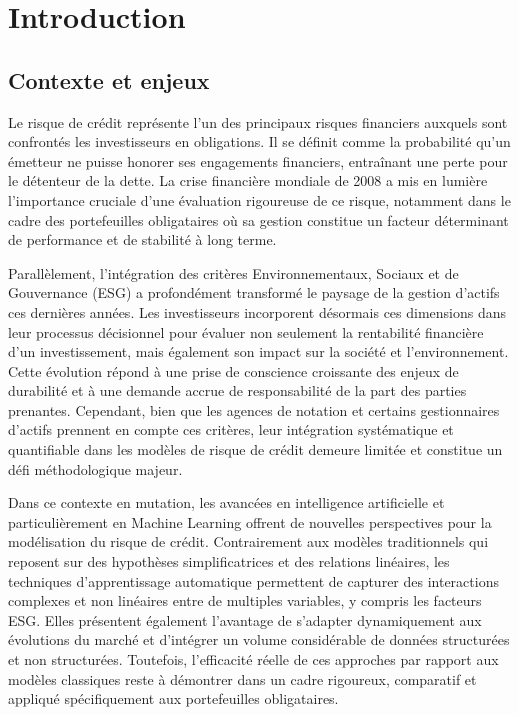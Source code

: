 \chapter{Introduction}

\section{Contexte et enjeux}

Le risque de crédit représente l'un des principaux risques financiers auxquels sont confrontés les investisseurs en obligations. Il se définit comme la probabilité qu'un émetteur ne puisse honorer ses engagements financiers, entraînant une perte pour le détenteur de la dette. La crise financière mondiale de 2008 a mis en lumière l'importance cruciale d'une évaluation rigoureuse de ce risque, notamment dans le cadre des portefeuilles obligataires où sa gestion constitue un facteur déterminant de performance et de stabilité à long terme.

Parallèlement, l'intégration des critères Environnementaux, Sociaux et de Gouvernance (ESG) a profondément transformé le paysage de la gestion d'actifs ces dernières années. Les investisseurs incorporent désormais ces dimensions dans leur processus décisionnel pour évaluer non seulement la rentabilité financière d'un investissement, mais également son impact sur la société et l'environnement. Cette évolution répond à une prise de conscience croissante des enjeux de durabilité et à une demande accrue de responsabilité de la part des parties prenantes. Cependant, bien que les agences de notation et certains gestionnaires d'actifs prennent en compte ces critères, leur intégration systématique et quantifiable dans les modèles de risque de crédit demeure limitée et constitue un défi méthodologique majeur.

Dans ce contexte en mutation, les avancées en intelligence artificielle et particulièrement en Machine Learning offrent de nouvelles perspectives pour la modélisation du risque de crédit. Contrairement aux modèles traditionnels qui reposent sur des hypothèses simplificatrices et des relations linéaires, les techniques d'apprentissage automatique permettent de capturer des interactions complexes et non linéaires entre de multiples variables, y compris les facteurs ESG. Elles présentent également l'avantage de s'adapter dynamiquement aux évolutions du marché et d'intégrer un volume considérable de données structurées et non structurées. Toutefois, l'efficacité réelle de ces approches par rapport aux modèles classiques reste à démontrer dans un cadre rigoureux, comparatif et appliqué spécifiquement aux portefeuilles obligataires.

